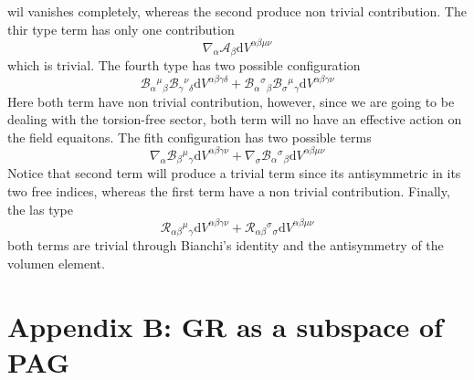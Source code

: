 \documentclass[10pt,a4paper]{article}
\begin{document}
wil vanishes completely, whereas the second produce non trivial contribution. The thir type term has only one contribution
\begin{equation*}
  \nabla_\alpha \mathcal{A}_\beta\mathrm{d}V^{\alpha\beta\mu\nu}
\end{equation*}
which is trivial. The fourth type has two possible configuration
\begin{equation*}
  \mathcal{B}_{\alpha}{}^{\mu}{}_{\beta}\mathcal{B}_{\gamma}{}^{\nu}{}_{\delta}\mathrm{d}V^{\alpha\beta\gamma\delta} + 
  \mathcal{B}_{\alpha}{}^{\sigma}{}_{\beta}\mathcal{B}_{\sigma}{}^{\mu}{}_{\gamma}\mathrm{d}V^{\alpha\beta\gamma\nu} 
\end{equation*}
Here both term have non trivial contribution, however, since we are going to be dealing with the torsion-free sector, both term will no have
an effective action on the field equaitons. The fith configuration has two possible terms
\begin{equation*}
  \nabla_\alpha \mathcal{B}_{\beta}{}^{\mu}{}_{\gamma}\mathrm{d}V^{\alpha\beta\gamma\nu} + 
  \nabla_\sigma \mathcal{B}_{\alpha}{}^{\sigma}{}_{\beta}\mathrm{d}V^{\alpha\beta\mu\nu}
\end{equation*}
Notice that second term will produce a trivial term since its antisymmetric in its two free indices, whereas the first term have a non trivial contribution. Finally,
the las type
\begin{equation*}
  \mathcal{R}_{\alpha\beta}{}^{\mu}{}_{\gamma}\mathrm{d}V^{\alpha\beta\gamma\nu} + 
  \mathcal{R}_{\alpha\beta}{}^{\sigma}{}_{\sigma}\mathrm{d}V^{\alpha\beta\mu\nu}
\end{equation*}
both terms are trivial through Bianchi's identity and the antisymmetry of the volumen element. 

\section{Appendix B: GR as a subspace of PAG}
\end{document}
